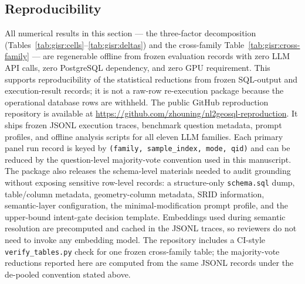 \subsection{Reproducibility}
\label{sec:gisr:reproducibility}

{\sloppy
All numerical results in this section --- the three-factor decomposition (Tables~\ref{tab:gisr:cells}--\ref{tab:gisr:deltas}) and the cross-family Table~\ref{tab:gisr:cross-family} --- are regenerable offline from frozen evaluation records with zero LLM API calls, zero PostgreSQL dependency, and zero GPU requirement. This supports reproducibility of the statistical reductions from frozen SQL-output and execution-result records; it is not a raw-row re-execution package because the operational database rows are withheld. The public GitHub reproduction repository is available at
\url{https://github.com/zhouning/nl2geosql-reproduction}. It ships frozen JSONL execution traces, benchmark question metadata, prompt profiles, and offline analysis scripts for all eleven LLM families. Each primary panel run record is keyed by \texttt{(family, sample\_index, mode, qid)} and can be reduced by the question-level majority-vote convention used in this manuscript. The package also releases the schema-level materials needed to audit grounding without exposing sensitive row-level records: a structure-only \texttt{schema.sql} dump, table/column metadata, geometry-column metadata, SRID information, semantic-layer configuration, the minimal-modification prompt profile, and the upper-bound intent-gate decision template. Embeddings used during semantic resolution are precomputed and cached in the JSONL traces, so reviewers do not need to invoke any embedding model. The repository includes a CI-style \texttt{verify\_tables.py} check for one frozen cross-family table; the majority-vote reductions reported here are computed from the same JSONL records under the de-pooled convention stated above.
\par}

